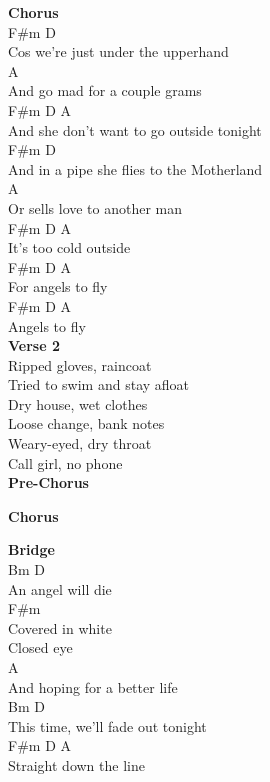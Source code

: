 \documentclass[a4paper]{article}
\begin{document}
{{        }
        \textbf{Chorus}
        ~\\
        {
            \cutive
            \obeyspaces
            F\#m           D
\\
Cos we're just under the upperhand
\\
A
\\
And go mad for a couple grams
\\
F\#m                   D      A
\\
And she don't want to go outside tonight
\\
          F\#m                   D
\\
And in a pipe she flies to the Motherland
\\
A
\\
Or sells love to another man
\\
F\#m       D       A
\\
It's too cold outside
\\
              F\#m D  A
\\
For angels to fly
\\
           F\#m D  A
\\
Angels to fly
\\

        }
        \textbf{Verse 2}
        ~\\
        {
            \cutive
            \obeyspaces
Ripped gloves, raincoat
\\
Tried to swim and stay afloat
\\
Dry house, wet clothes
\\
Loose change, bank notes
\\
Weary-eyed, dry throat
\\
Call girl, no phone
\\

        }
        \textbf{Pre-Chorus}
        ~\\
        {
            \cutive
            \obeyspaces

        }
        \textbf{Chorus}
        ~\\
        {
            \cutive
            \obeyspaces

        }
        \textbf{Bridge}
        ~\\
        {
            \cutive
            \obeyspaces
Bm             D
\\
An angel will die
\\
             F\#m
\\
Covered in white
\\
Closed eye
\\
         A
\\
And hoping for a better life
\\
Bm                         D
\\
This time, we'll fade out tonight
\\
                  F\#m D A
\\
Straight down the line
\\

}}
\end{document}
